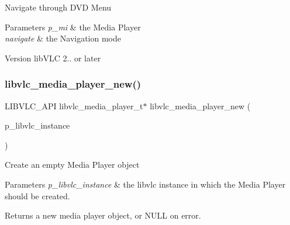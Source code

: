 Navigate through D\+VD Menu


\begin{DoxyParams}{Parameters}
{\em p\+\_\+mi} & the Media Player \\
\hline
{\em navigate} & the Navigation mode \\
\hline
\end{DoxyParams}
\begin{DoxyVersion}{Version}
lib\+V\+LC 2.. or later 
\end{DoxyVersion}
\mbox{\label{group__libvlc__media__player_ga210a0f60ad0a2a7ac0460269b5ac2b34}} 
\subsubsection{\texorpdfstring{libvlc\+\_\+media\+\_\+player\+\_\+new()}{libvlc\_media\_player\_new()}}
{\footnotesize\ttfamily L\+I\+B\+V\+L\+C\+\_\+\+A\+PI libvlc\+\_\+media\+\_\+player\+\_\+t$\ast$ libvlc\+\_\+media\+\_\+player\+\_\+new (\begin{DoxyParamCaption}\item[{\hyperlink{group__libvlc__core_ga316d739a80da4678206c79f4d6c2e284}{libvlc\+\_\+instance\+\_\+t} $\ast$}]{p\+\_\+libvlc\+\_\+instance }\end{DoxyParamCaption})}

Create an empty Media Player object


\begin{DoxyParams}{Parameters}
{\em p\+\_\+libvlc\+\_\+instance} & the libvlc instance in which the Media Player should be created. \\
\hline
\end{DoxyParams}
\begin{DoxyReturn}{Returns}
a new media player object, or N\+U\+LL on error. 
\end{DoxyReturn}
\mbox{\label{group__libvlc__media__player_gaf6897a4ef07c684555fc600c7a63a8c4}} 
